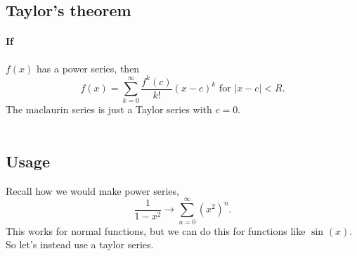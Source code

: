 \subsection*{Taylor's theorem}%
\label{sub:Taylor's theorem}
\paragraph{If} $ f\left( x \right)  $ has a power series, then 
\[
f\left( x \right)=\sum_{ k=0 } ^{ \infty } \frac{ f^{ k }\left( c \right)  }{ k! }\left( x-c \right) ^{ k } \text{ for } \left| x-c \right|<R
.\] 
The maclaurin series is just a Taylor series with $ c=0 $. \\ \\

\subsection*{Usage}%
\label{sub:Usage}
Recall how we would make power series,
\[
\frac{ 1 }{ 1-x^2 } \to \sum_{ n=0 } ^{ \infty } \left( x^2 \right) ^{ n }
.\] 
This works for normal functions, but we can do this for functions like $ \sin^{  } \left( x \right)  $. So let's instead use a taylor series.\\ \\
